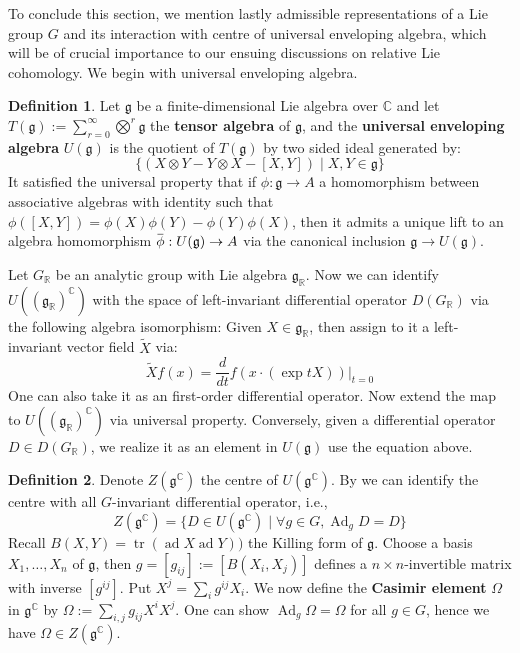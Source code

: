 \documentclass[11pt]{report}
\theoremstyle{definition}
\newtheorem{Def}{Definition}[chapter]
\theoremstyle{plain}
\DeclareMathOperator{\tr}{tr}
\DeclareMathOperator{\Ad}{Ad}
\DeclareMathOperator{\ad}{ad}
\newcommand{\real}{\mathbb{R}}
\newcommand{\complex}{\mathbb{C}}
\newcommand{\overbar}[1]{\mkern 1.5mu\overline{\mkern-1.5mu#1\mkern-1.5mu}\mkern 1.5mu}
\renewcommand{\bar}{\overbar}
\renewcommand{\tilde}{\widetilde}
\newcommand{\Lie}[1]{\mathfrak{#1}}
\begin{document}
To conclude this section, we mention lastly admissible representations of a Lie group $G$ and its interaction with centre of universal enveloping algebra, which will be of crucial importance to our ensuing discussions on relative Lie cohomology. We begin with universal enveloping algebra.
\begin{Def}
	Let $\Lie{g}$ be a finite-dimensional Lie algebra over $\complex$ and let $T(\Lie{g}):=\sum_{r=0}^\infty \bigotimes^r\Lie{g}$ the \textbf{tensor algebra} of $\Lie{g}$, and the \textbf{universal enveloping algebra} $U(\Lie{g})$ is the quotient of $T(\Lie{g})$ by two sided ideal generated by:
	\begin{equation*}
	\{(X\otimes Y-Y\otimes X-[X, Y])\mid X, Y\in \Lie{g}\}
	\end{equation*}
	It satisfied the universal property that if $\phi: \Lie{g}\to A$ a homomorphism between associative algebras with identity such that $\phi([X, Y])=\phi(X)\phi(Y)-\phi(Y)\phi(X)$, then it admits a unique lift to an algebra homomorphism $\bar{\phi}:U(\Lie{g})\to A$ via the canonical inclusion $\Lie{g}\to U(\Lie{g})$. 
\end{Def}
Let $G_\real$ be an analytic group with Lie algebra $\Lie{g}_\real$. Now we can identify $U((\Lie{g}_\real)^\complex)$ with the space of left-invariant differential operator $D(G_\real)$ via the following algebra isomorphism: Given $X\in \Lie{g}_\real$, then assign to it a left-invariant vector field $\tilde{X}$ via:
\begin{equation}
\tilde{X}f(x)=\frac{d}{dt}f(x\cdot(\exp tX))\big|_{t=0}
\end{equation}
One can also take it as an first-order differential operator. Now extend the map to $U((\Lie{g}_\real)^\complex)$ via universal property. Conversely, given a differential operator $D\in D(G_\real)$, we realize it as an element in $U(\Lie{g})$ use the equation above. 
\begin{Def}\label{casimir}
	Denote $Z(\Lie{g}^\complex)$ the centre of $U(\Lie{g}^\complex)$. By \cite[Proposition~3.8]{knapp2016} we can identify the centre with all $G$-invariant differential operator, i.e., 
	\begin{equation}
	Z(\Lie{g}^\complex)=\{D\in U(\Lie{g}^\complex)\mid \forall g\in G, \Ad_gD=D  \}
	\end{equation}
	Recall $B(X,Y)=\tr(\ad X \ad Y))$ the Killing form of $\Lie{g}$. Choose a basis $X_1, \dots, X_n$ of $\Lie{g}$, then $g=[g_{ij}]:=[B(X_i, X_j)]$ defines a $n\times n$-invertible matrix with inverse $[g^{ij}]$. Put $X^j=\sum_i g^{ij}X_i$. We now define the \textbf{Casimir element} $\Omega$ in $\Lie{g}^\complex$ by $\Omega:=\sum_{i,j}g_{ij}X^iX^j$. One can show $\Ad_g\Omega=\Omega$ for all $g\in G$, hence we have $\Omega\in Z(\Lie{g}^\complex)$.
\end{Def}
\end{document}
